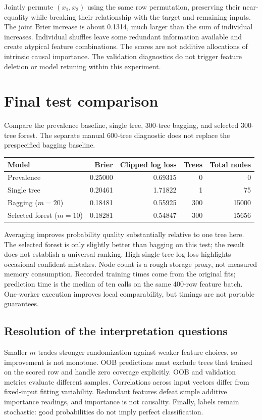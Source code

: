 Jointly permute $(x_1,x_2)$ using the same row permutation, preserving their near-equality while breaking their relationship with the target and remaining inputs. The joint Brier increase is about 0.1314, much larger than the sum of individual increases. Individual shuffles leave some redundant information available and create atypical feature combinations. The scores are not additive allocations of intrinsic causal importance.
The validation diagnostics do not trigger feature deletion or model retuning within this experiment.

\section{Final test comparison}
Compare the prevalence baseline, single tree, 300-tree bagging, and selected 300-tree forest. The separate manual 600-tree diagnostic does not replace the prespecified bagging baseline.
\begin{center}
\begin{tabular}{lrrrr}\toprule
Model&Brier&Clipped log loss&Trees&Total nodes\\\midrule
Prevalence&0.25000&0.69315&0&0\\
Single tree&0.20461&1.71822&1&75\\
Bagging ($m=20$)&0.18481&0.55925&300&15000\\
Selected forest ($m=10$)&0.18281&0.54847&300&15656\\\bottomrule
\end{tabular}
\end{center}
Averaging improves probability quality substantially relative to one tree here. The selected forest is only slightly better than bagging on this test; the result does not establish a universal ranking. High single-tree log loss highlights occasional confident mistakes.
Node count is a rough storage proxy, not measured memory consumption. Recorded training times come from the original fits; prediction time is the median of ten calls on the same 400-row feature batch. One-worker execution improves local comparability, but timings are not portable guarantees.

\subsection*{Resolution of the interpretation questions}
Smaller $m$ trades stronger randomization against weaker feature choices, so improvement is not monotone. OOB predictions must exclude trees that trained on the scored row and handle zero coverage explicitly. OOB and validation metrics evaluate different samples. Correlations across input vectors differ from fixed-input fitting variability. Redundant features defeat simple additive importance readings, and importance is not causality. Finally, labels remain stochastic: good probabilities do not imply perfect classification.

